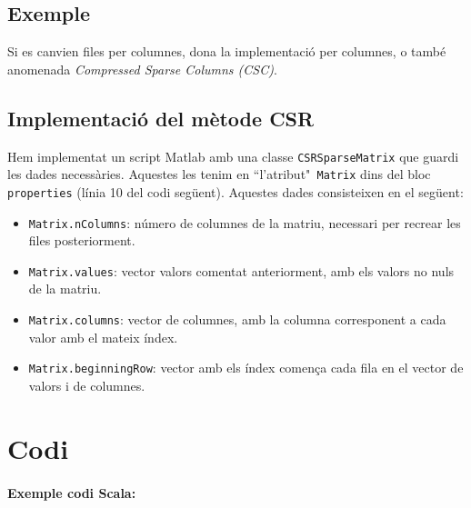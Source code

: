 \documentclass[11pt,a4paper,twoside]{report}
\begin{document}
\subsection{Exemple}

Si es canvien files per columnes, dona la implementació per columnes, o també anomenada \textit{Compressed Sparse Columns (CSC)}.

\subsection{Implementació del mètode CSR}

Hem implementat un script Matlab amb una classe \texttt{CSRSparseMatrix} que guardi les dades necessàries. Aquestes les tenim en ``l'atribut"\texttt{ Matrix} dins del bloc \texttt{properties} (línia 10 del codi següent). Aquestes dades consisteixen en el següent:	
\begin{itemize}
\item  \texttt{Matrix.nColumns}: número de columnes de la matriu, necessari per recrear les files posteriorment.
\item  \texttt{Matrix.values}: vector valors comentat anteriorment, amb els valors no nuls de la matriu.
\item  \texttt{Matrix.columns}: vector de columnes, amb la columna corresponent a cada valor amb el mateix índex.
\item  \texttt{Matrix.beginningRow}: vector amb els índex comença cada fila en el vector de valors i de columnes.
\end{itemize}


\newpage
\section {Codi}

\paragraph*{Exemple codi Scala:}\mbox{}\\



%
 
\end{document}
